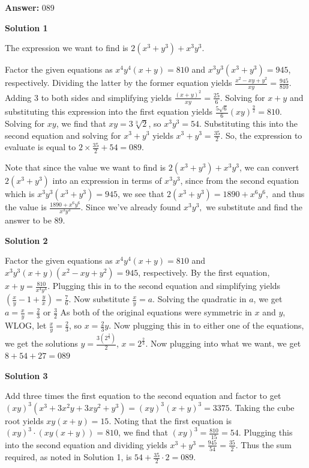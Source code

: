\begin{enumerate}
 
 \textbf{Answer: }089



\textbf{Solution 1}

The expression we want to find is $2(x^3+y^3) + x^3y^3$.

 Factor the given equations as $x^4y^4(x+y) = 810$ and $x^3y^3(x^3+y^3)=945$, respectively. Dividing the latter by the former equation yields $\frac{x^2-xy+y^2}{xy} = \frac{945}{810}$. Adding 3 to both sides and simplifying yields $\frac{(x+y)^2}{xy} = \frac{25}{6}$. Solving for $x+y$ and substituting this expression into the first equation yields $\frac{5\sqrt{6}}{6}(xy)^{\frac{9}{2}} = 810$. Solving for $xy$, we find that $xy = 3\sqrt[3]{2}$, so $x^3y^3 = 54$. Substituting this into the second equation and solving for $x^3+y^3$ yields $x^3+y^3=\frac{35}{2}$. So, the expression to evaluate is equal to $2 \times \frac{35}{2} + 54 = \boxed{089}$.

 Note that since the value we want to find is $2(x^3+y^3)+x^3y^3$, we can convert $2(x^3+y^3)$ into an expression in terms of $x^3y^3$, since from the second equation which is $x^3y^3(x^3+y^3)=945$, we see that $2(x^3+y^3)=1890+x^6y^6,$ and thus the value is $\frac{1890+x^6y^6}{x^3y^3}.$ Since we've already found $x^3y^3,$ we substitute and find the answer to be 89.

 



\textbf{Solution 2}

Factor the given equations as $x^4y^4(x+y) = 810$ and $x^3y^3(x+y)(x^2-xy+y^2)=945$, respectively. By the first equation, $x+y=\frac{810}{x^4y^4}$. Plugging this in to the second equation and simplifying yields $(\frac{x}{y}-1+\frac{y}{x})=\frac{7}{6}$. Now substitute $\frac{x}{y}=a$. Solving the quadratic in $a$, we get $a=\frac{x}{y}=\frac{2}{3}$ or $\frac{3}{2}$ As both of the original equations were symmetric in $x$ and $y$, WLOG, let $\frac{x}{y}=\frac{2}{3}$, so $x=\frac{2}{3}y$. Now plugging this in to either one of the equations, we get the solutions $y=\frac{3(2^{\frac{2}{3}})}{2}$, $x=2^{\frac{2}{3}}$. Now plugging into what we want, we get $8+54+27=\boxed{089}$




\textbf{Solution 3}

Add three times the first equation to the second equation and factor to get $(xy)^3(x^3+3x^2y+3xy^2+y^3)=(xy)^3(x+y)^3=3375$. Taking the cube root yields $xy(x+y)=15$. Noting that the first equation is $(xy)^3\cdot(xy(x+y))=810$, we find that $(xy)^3=\frac{810}{15}=54$. Plugging this into the second equation and dividing yields $x^3+y^3 = \frac{945}{54} = \frac{35}{2}$. Thus the sum required, as noted in Solution 1, is $54+\frac{35}{2}\cdot2 = \boxed{089}$.


\end{enumerate}
